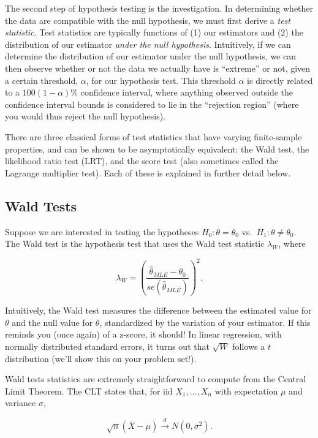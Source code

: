 \documentclass[
  letterpaper,
  DIV=11,
  numbers=noendperiod]{scrreprt}
\begin{document}
The second step of hypothesis testing is the investigation. In
determining whether the data are compatible with the null hypothesis, we
must first derive a \emph{test statistic}. Test statistics are typically
functions of (1) our estimators and (2) the distribution of our
estimator \emph{under the null hypothesis}. Intuitively, if we can
determine the distribution of our estimator under the null hypothesis,
we can then observe whether or not the data we actually have is
``extreme'' or not, given a certain threshold, \(\alpha\), for our
hypothesis test. This threshold \(\alpha\) is directly related to a
\(100(1 - \alpha)\%\) confidence interval, where anything observed
outside the confidence interval bounds is considered to lie in the
``rejection region'' (where you would thus reject the null hypothesis).

There are three classical forms of test statistics that have varying
finite-sample properties, and can be shown to be asymptotically
equivalent: the Wald test, the likelihood ratio test (LRT), and the
score test (also sometimes called the Lagrange multiplier test). Each of
these is explained in further detail below.

\hypertarget{wald-tests}{%
\subsection*{Wald Tests}\label{wald-tests}}

Suppose we are interested in testing the hypotheses
\(H_0: \theta = \theta_0\) vs.~\(H_1: \theta \neq \theta_0\). The Wald
test is the hypothesis test that uses the Wald test statistic
\(\lambda_{W}\), where

\[
\lambda_W = \left( \frac{\hat{\theta}_{MLE} - \theta_0}{se(\hat{\theta}_{MLE})}\right)^2.
\]

Intuitively, the Wald test measures the difference between the estimated
value for \(\theta\) and the null value for \(\theta\), standardized by
the variation of your estimator. If this reminds you (once again) of a
z-score, it should! In linear regression, with normally distributed
standard errors, it turns out that \(\sqrt{W}\) follows a \(t\)
distribution (we'll show this on your problem set!).

Wald tests statistics are extremely straightforward to compute from the
Central Limit Theorem. The CLT states that, for iid \(X_1, \dots, X_n\)
with expectation \(\mu\) and variance \(\sigma\),

\[
\sqrt{n} (\overline{X} - \mu) \overset{d}{\to} N(0, \sigma^2).
\]
\end{document}
